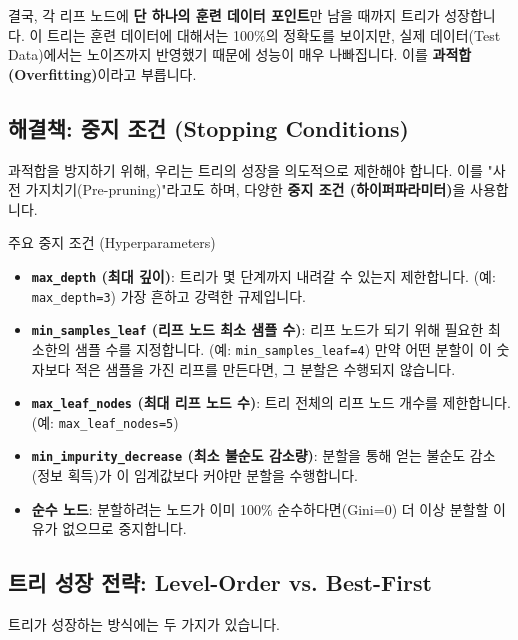 \documentclass[11pt,a4paper]{book}
\theoremstyle{definition}
\begin{document}
결국, 각 리프 노드에 \textbf{단 하나의 훈련 데이터 포인트}만 남을 때까지 트리가 성장합니다.
이 트리는 훈련 데이터에 대해서는 100\%의 정확도를 보이지만, 실제 데이터(Test Data)에서는 노이즈까지 반영했기 때문에 성능이 매우 나빠집니다.
이를 \textbf{과적합(Overfitting)}이라고 부릅니다.

\subsection{해결책: 중지 조건 (Stopping Conditions)}

과적합을 방지하기 위해, 우리는 트리의 성장을 의도적으로 제한해야 합니다.
이를 "사전 가지치기(Pre-pruning)"라고도 하며, 다양한 \textbf{중지 조건 (하이퍼파라미터)}을 사용합니다.

\begin{tcolorbox}{주요 중지 조건 (Hyperparameters)}
    \begin{itemize}
        \item \textbf{\texttt{max\_depth} (최대 깊이)}: 트리가 몇 단계까지 내려갈 수 있는지 제한합니다. (예: \texttt{max\_depth=3}) 가장 흔하고 강력한 규제입니다.
        \item \textbf{\texttt{min\_samples\_leaf} (리프 노드 최소 샘플 수)}: 리프 노드가 되기 위해 필요한 최소한의 샘플 수를 지정합니다. (예: \texttt{min\_samples\_leaf=4}) 만약 어떤 분할이 이 숫자보다 적은 샘플을 가진 리프를 만든다면, 그 분할은 수행되지 않습니다.
        \item \textbf{\texttt{max\_leaf\_nodes} (최대 리프 노드 수)}: 트리 전체의 리프 노드 개수를 제한합니다. (예: \texttt{max\_leaf\_nodes=5})
        \item \textbf{\texttt{min\_impurity\_decrease} (최소 불순도 감소량)}: 분할을 통해 얻는 불순도 감소(정보 획득)가 이 임계값보다 커야만 분할을 수행합니다.
        \item \textbf{순수 노드}: 분할하려는 노드가 이미 100\% 순수하다면(Gini=0) 더 이상 분할할 이유가 없으므로 중지합니다.
    \end{itemize}
\end{tcolorbox}

\subsection{트리 성장 전략: Level-Order vs. Best-First}

트리가 성장하는 방식에는 두 가지가 있습니다.
\end{document}

